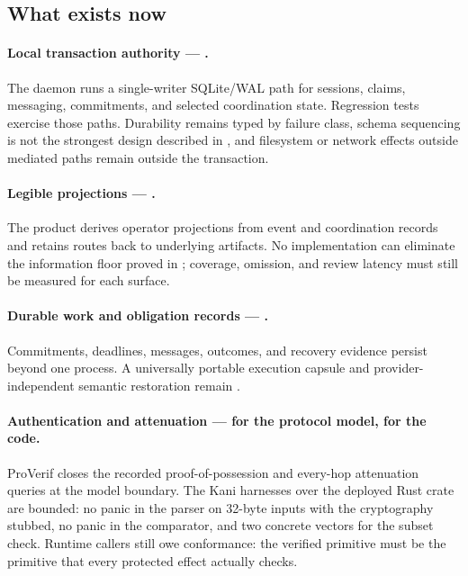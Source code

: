 \subsection{What exists now}

\paragraph{Local transaction authority --- \BuiltWeak.}
The daemon runs a single-writer SQLite/WAL path for sessions, claims, messaging,
commitments, and selected coordination state. Regression tests exercise those
paths. Durability remains typed by failure class, schema sequencing is not the
strongest design described in , and filesystem or network effects
outside mediated paths remain outside the transaction.

\paragraph{Legible projections --- \BuiltWeak.}
The product derives operator projections from event and coordination records and
retains routes back to underlying artifacts. No implementation can eliminate the
information floor proved in ; coverage, omission, and review latency
must still be measured for each surface.

\paragraph{Durable work and obligation records --- \BuiltWeak.}
Commitments, deadlines, messages, outcomes, and recovery evidence persist beyond
one process. A universally portable execution capsule and provider-independent
semantic restoration remain \Designed{}.

\paragraph{Authentication and attenuation --- \Closed{} for the protocol model, \Partial{} for the code.}
ProVerif closes the recorded proof-of-possession and every-hop attenuation
queries at the model boundary. The Kani harnesses over the deployed Rust crate
are bounded: no panic in the parser on 32-byte inputs with the cryptography
stubbed, no panic in the comparator, and two concrete vectors for the subset
check. Runtime callers still owe conformance: the verified primitive must be the
primitive that every protected effect actually checks.

